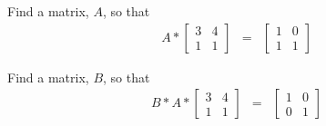 \begin{problem}
    \begin{subproblem}
    \item Find a matrix, $A$, so that
      \begin{eqnarray*}
        A * \left[
          \begin{array}{rr}
            3 & 4 \\ 
            1 & 1
          \end{array}
        \right] 
        & = & 
        \left[
          \begin{array}{rr}
             1 & 0 \\ 
             1 & 1
          \end{array}
        \right] 
      \end{eqnarray*}
      
      \vfill

    \item Find a matrix, $B$, so that
      \begin{eqnarray*}
        B * A * \left[
          \begin{array}{rr}
            3 & 4 \\ 
            1 & 1
          \end{array}
        \right] 
        & = & 
        \left[
          \begin{array}{rr}
             1 & 0 \\ 
             0 & 1
          \end{array}
        \right] 
      \end{eqnarray*}

      \vfill

      \end{subproblem}
\end{problem}


